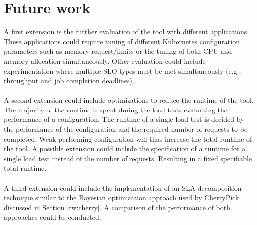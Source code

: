 \section{Future work}
 A first extension is the further evaluation of the tool with different applications. These applications could require tuning of different Kubernetes configuration parameters such as memory request/limits or the tuning of both CPU and memory allocation simultaneously. Other evaluation could include experimentation where multiple SLO types must be met simultaneously (e.g., throughput and job completion deadlines).
\\\\
A second extension could include optimizations to reduce the runtime of the tool.  The majority of the runtime is spent during the load tests evaluating the performance of a configuration. The runtime of a single load test is decided by the performance of the configuration and the required number of requests to be completed. Weak performing configuration will thus increase the total runtime of the tool. A possible extension could include the specification of a runtime for a single load test instead of the number of requests. Resulting in a fixed specifiable total runtime.
\\\\
A third extension could include the implementation of an SLA-decomposition technique similar to the Bayesian optimization approach used by CherryPick \cite{alipourfard2017cherrypick} discussed in Section \ref{rw:cherry}. A comparison of the performance of both approaches could be conducted. 

